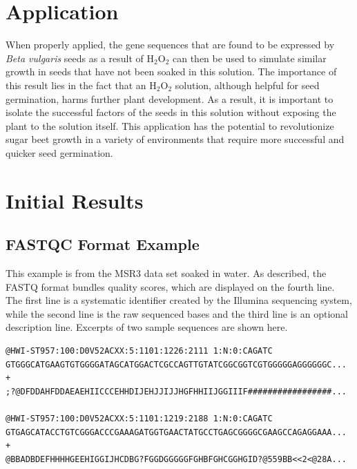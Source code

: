 \documentclass{article}
\begin{document}
\section{Application}
	When properly applied, the gene sequences that are found to be expressed by \emph{Beta vulgaris} seeds as a result of H$_{2}$O$_{2}$ can then be used to simulate similar growth in seeds that have not been soaked in this solution. The importance of this result lies in the fact that an H$_{2}$O$_{2}$ solution, although helpful for seed germination, harms further plant development. As a result, it is important to isolate the successful factors of the seeds in this solution without exposing the plant to the solution itself. This application has the potential to revolutionize sugar beet growth in a variety of environments that require more successful and quicker seed germination.

\section{Initial Results}

\subsection{FASTQC Format Example}
	This example is from the MSR3 data set soaked in water. As described, the FASTQ format bundles quality scores, which are displayed on the fourth line. The first line is a systematic identifier created by the Illumina sequencing system, while the second line is the raw sequenced bases and the third line is an optional description line. Excerpts of two sample sequences are shown here. \\
\begin{verbatim}
@HWI-ST957:100:D0V52ACXX:5:1101:1226:2111 1:N:0:CAGATC
GTGGGCATGAAGTGTGGGGATAGCATGGACTCGCCAGTTGTATCGGCGGTCGTGGGGGAGGGGGGC...
+
;?@DFDDAHFDDAEAEHIICCCEHHDIJEHJJIJJHGFHHIIJGGIIIF#################...

@HWI-ST957:100:D0V52ACXX:5:1101:1219:2188 1:N:0:CAGATC
GTGAGCATACCTGTCGGGACCCGAAAGATGGTGAACTATGCCTGAGCGGGGCGAAGCCAGAGGAAA...
+
@BBADBDEFHHHHGEEHIGGIJHCDBG?FGGDGGGGGFGHBFGHCGGHGID?@559BB<<2<@28A...
\end{verbatim}
\end{document}
